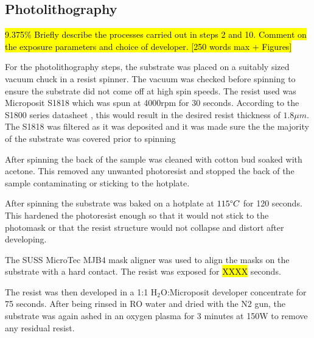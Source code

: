 \subsection{Photolithography}
\label{sec:fab:photolithography}

\hl{9.375\% Briefly describe the processes carried out in steps 2 and 10. Comment on the exposure parameters and choice of developer. [250 words max + Figures]}

For the photolithography steps, the substrate was placed on a suitably sized vacuum chuck in a resist spinner. The vacuum was checked before spinning to ensure the substrate did not come off at high spin speeds. The resist used was Microposit S1818 which was spun at 4000rpm for 30 seconds. According to the S1800 series datasheet \cite{s18}, this would result in the desired resist thickness of $1.8\mu m$. The S1818 was filtered as it was deposited and it was made sure the the majority of the substrate was covered prior to spinning

After spinning the back of the sample was cleaned with cotton bud soaked with acetone. This removed any unwanted photoresist and stopped the back of the sample contaminating or sticking to the hotplate.

After spinning the substrate was baked on a hotplate at $115\degree C$ for 120 seconds. This hardened the photoresist enough so that it would not stick to the photomask or that the resist structure would not collapse and distort after developing.

The SUSS MicroTec MJB4 mask aligner was used to align the masks on the substrate with a hard contact. The resist was exposed for \hl{XXXX} seconds.

The resist was then developed in a 1:1 H$_2$O:Microposit developer concentrate for 75 seconds. After being rinsed in RO water and dried with the N2 gun, the substrate was again ashed in an oxygen plasma for 3 minutes at 150W to remove any residual resist.
